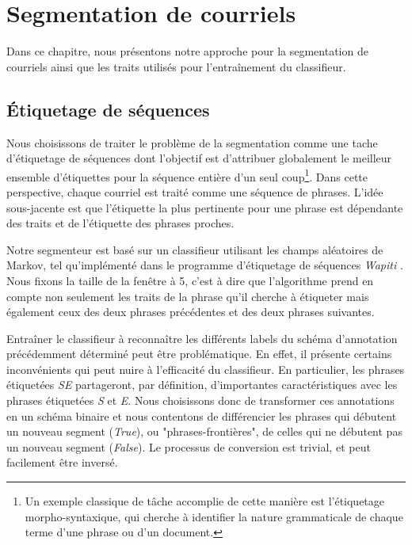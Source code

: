 
\chapter{Segmentation de courriels}

\label{ch:methodology_for_email_segmentation}

Dans ce chapitre, nous présentons notre approche pour la segmentation de courriels ainsi que les traits utilisés pour l’entraînement du classifieur.

\section{Étiquetage de séquences}

Nous choisissons de traiter le problème de la segmentation comme une tache d'étiquetage de séquences dont l'objectif est d'attribuer globalement le meilleur ensemble d'étiquettes pour la séquence entière d'un seul coup\footnote{Un exemple classique de tâche accomplie de cette manière est l'étiquetage morpho-syntaxique, qui cherche à identifier la nature grammaticale de chaque terme d'une phrase ou d'un document.}. Dans cette perspective, chaque courriel est traité comme une séquence de phrases. L'idée sous-jacente est que l'étiquette la plus pertinente pour une phrase est dépendante des traits et de l'étiquette des phrases proches. 

Notre segmenteur est basé sur un classifieur utilisant les champs aléatoires de Markov, tel qu'implémenté dans le programme d'étiquetage de séquences \textit{Wapiti} \cite{lavergne2010practical}. Nous fixons la taille de la fenêtre à 5, c'est à dire que l'algorithme prend en compte non seulement les traits de la phrase qu'il cherche à étiqueter mais également ceux des deux phrases précédentes et des deux phrases suivantes.

Entraîner le classifieur à reconnaître les différents labels du schéma d'annotation précédemment déterminé peut être problématique. En effet, il présente certains inconvénients qui peut nuire à l'efficacité du classifieur. En particulier, les phrases étiquetées \textit{SE} partageront, par définition, d'importantes caractéristiques avec les phrases étiquetées \textit{S} et \textit{E}. Nous choisissons donc de transformer ces annotations en un schéma binaire et nous contentons de différencier les phrases qui débutent un nouveau segment (\textit{True}), ou "phrases-frontières", de celles qui ne débutent pas un nouveau segment (\textit{False}). Le processus de conversion est trivial, et peut facilement être inversé.

